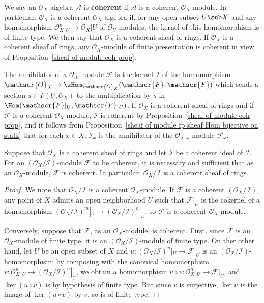 We say an $\mathscr{O}_X$-algebra $\mathscr{A}$ is \textbf{coherent} if $\mathscr{A}$ is a coherent $\mathscr{O}_X$-module. In particular, $\mathscr{O}_X$ is a coherent $\mathscr{O}_X$-algebra if, for any open subset $U\sub X$ and any homomorphism $\mathscr{O}_X^n|_U\to\mathscr{O}_X|U$ of $\mathscr{O}_U$-modules, the kernel of this homomorphism is of finite type. We then say that $\mathscr{O}_X$ is a coherent sheaf of rings. If $\mathscr{O}_X$ is a coherent sheaf of rings, any $\mathscr{O}_X$-module of finite presentation is coherent in view of Proposition~\ref{sheaf of module coh prop}.
\begin{example}
The annihilator of a $\mathscr{O}_X$-module $\mathscr{F}$ is the kernel $\mathscr{I}$ of the homomorphism $\mathscr{O}_X\to\sHom_{\mathscr{O}_X}(\mathscr{F},\mathscr{F})$ which sends a section $s\in\Gamma(U,\mathscr{O}_X)$ to the multiplication by $s$ in $\Hom(\mathscr{F}|_U,\mathscr{F}|_U)$. If $\mathscr{O}_X$ is a coherent sheaf of rings and if $\mathscr{F}$ is a coherent $\mathscr{O}_X$-module, $\mathscr{I}$ is coherent by Proposition~\ref{sheaf of module coh prop}, and it follows from Proposition~\ref{sheaf of module fp sheaf Hom bijective on stalk} that for each $x\in X$, $\mathscr{I}_x$ is the annihilator of the $\mathscr{O}_{X,x}$-module $\mathscr{F}_x$.
\end{example}
\begin{proposition}\label{sheaf of module O/I coh iff}
Suppose that $\mathscr{O}_X$ is a coherent sheaf of rings and let $\mathscr{I}$ be a coherent ideal of $\mathscr{I}$. For an $(\mathscr{O}_X/\mathscr{I})$-module $\mathscr{F}$ to be coherent, it is necessary and sufficient that as an $\mathscr{O}_X$-module, $\mathscr{F}$ is coherent. In particular, $\mathscr{O}_X/\mathscr{I}$ is a coherent sheaf of rings.
\end{proposition}
\begin{proof}
We note that $\mathscr{O}_X/\mathscr{I}$ is a coherent $\mathscr{O}_X$-module. If $\mathscr{F}$ is a coherent $(\mathscr{O}_X/\mathscr{I})$, any point of $X$ admits an open neighborhood $U$ such that $\mathscr{F}|_U$ is the cokernel of a homomorphism $(\mathscr{O}_X/\mathscr{I})^m|_U\to (\mathscr{O}_X/\mathscr{I})^n|_U$, so $\mathscr{F}$ is a coherent $\mathscr{O}_X$-module.\par
Conversely, suppose that $\mathscr{F}$, as an $\mathscr{O}_X$-module, is coherent. First, since $\mathscr{F}$ is an $\mathscr{O}_X$-module of finite type, it is an $(\mathscr{O}_X/\mathscr{I})$-module of finite type. On ther other hand, let $U$ be an open subset of $X$ and $u:(\mathscr{O}_X/\mathscr{I})^n|_U\to\mathscr{F}|_U$ is an $(\mathscr{O}_X/\mathscr{I})$-homomorphism; by composing with the canonical homomorphism $v:\mathscr{O}_X^n|_U\to(\mathscr{O}_X/\mathscr{I})^n|_U$, we obtain a homomorphism $u\circ v:\mathscr{O}_X^n|_U\to\mathscr{F}|_U$, and $\ker(u\circ v)$ is by hypothesis of finite type. But since $v$ is surjective, $\ker u$ is the image of $\ker(u\circ v)$ by $v$, so is of finite type.
\end{proof}

